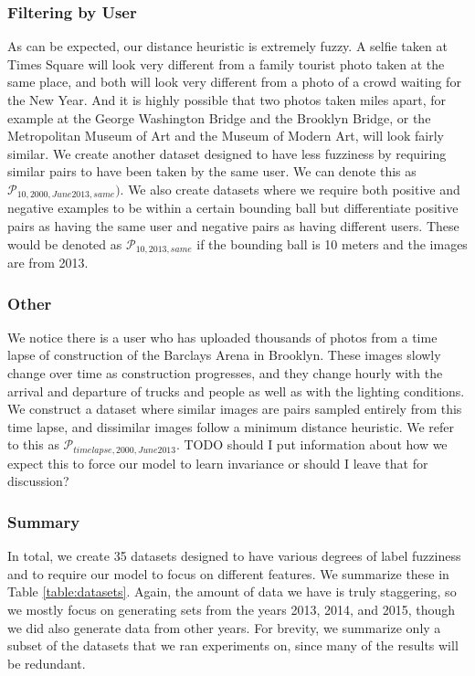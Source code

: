 \subsubsection{Filtering by User}
As can be expected, our distance heuristic is extremely fuzzy. A selfie taken at Times Square will look very different from a family tourist photo taken at the same place, and both will look very different from a photo of a crowd waiting for the New Year. And it is highly possible that two photos taken miles apart, for example at the George Washington Bridge and the Brooklyn Bridge, or the Metropolitan Museum of Art and the Museum of Modern Art, will look fairly similar. We create another dataset designed to have less fuzziness by requiring similar pairs to have been taken by the same user. We can denote this as $\mathcal{P}_{10,2000,June2013,same})$. We also create datasets where we require both positive and negative examples to be within a certain bounding ball but differentiate positive pairs as having the same user and negative pairs as having different users. These would be denoted as $\mathcal{P}_{10,2013,same}$ if the bounding ball is 10 meters and the images are from 2013. 

\subsubsection{Other}
We notice there is a user who has uploaded thousands of photos from a time lapse of construction of the Barclays Arena in Brooklyn. These images slowly change over time as construction progresses, and they change hourly with the arrival and departure of trucks and people as well as with the lighting conditions. We construct a dataset where similar images are pairs sampled entirely from this time lapse, and dissimilar images follow a minimum distance heuristic. We refer to this as $\mathcal{P}_{timelapse,2000,June2013}$. TODO should I put information about how we expect this to force our model to learn invariance or should I leave that for discussion?

\subsubsection{Summary}
In total, we create 35 datasets designed to have various degrees of label fuzziness and to require our model to focus on different features. We summarize these in Table \ref{table:datasets}. Again, the amount of data we have is truly staggering, so we mostly focus on generating sets from the years 2013, 2014, and 2015, though we did also generate data from other years. For brevity, we summarize only a subset of the datasets that we ran experiments on, since many of the results will be redundant. 

